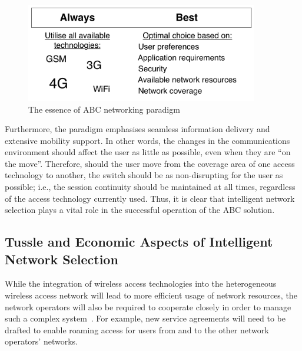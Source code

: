 \begin{figure}[ht]
    \centering
    \includegraphics[width=4in]{Intelligent/Figures/abc}
    \caption{The essence of ABC networking paradigm}
    \label{fig:abc_intelligent}
\end{figure}

Furthermore, the paradigm emphasises seamless information delivery and extensive mobility support. In other words, the changes in the communications environment should affect the user as little as possible, even when they are ``on the move''. Therefore, should the user move from the coverage area of one access technology to another, the switch should be as non-disrupting for the user as possible; i.e., the session continuity should be maintained at all times, regardless of the access technology currently used. Thus, it is clear that intelligent network selection plays a vital role in the successful operation of the ABC solution.

\subsection{Tussle and Economic Aspects of Intelligent Network Selection} %
\label{sub:tussle_and_economic_aspects_of_intelligent_network_selection_intelligent}
While the integration of wireless access technologies into the heterogeneous wireless access network will lead to more efficient usage of network resources, the network operators will also be required to cooperate closely in order to manage such a complex system~\cite{HossainBeaubrun09,HossainTalebiFard09}. For example, new service agreements will need to be drafted to enable roaming access for users from and to the other network operators' networks.

